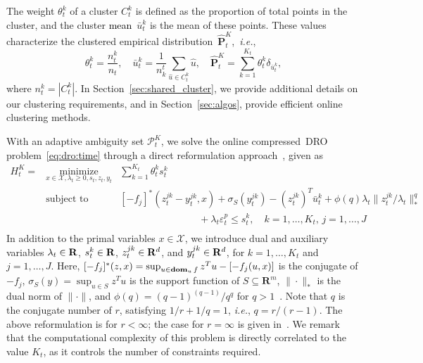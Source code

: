 \documentclass[12pt]{article}
\newcommand{\ie}{{\it i.e.}}
\newcommand{\reals}{{\bf R}}
\newcommand{\prob}{{\mathbf P}}
\newcommand{\dom}{\mathop{\bf dom}_u} %
\newcommand{\define}{=}
\newcommand{\supp}{S}
\newcommand{\unc}{u}
\newcommand{\epsnom}{\varepsilon}
\newcommand{\RC}[1]{\textcolor{black}{#1}}
\newcommand{\RC}[1]{\textcolor{blue}{#1}}
\begin{document}
The weight $\theta^k_t$ of a cluster $C^k_t$ is defined as the proportion of total points in the cluster, and the cluster \RC{mean}~$\bar{\unc}^k_t$ is the mean of these points. These values characterize the clustered empirical distribution~$\hat{\prob}^K_t$,~\ie,
$$\theta_t^k = \frac{n^k_t}{n_t},\quad \bar{u}^k_t = \frac{1}{n^t_k} \sum_{\hat{u} \in C^k_t} \hat{u},\quad \hat{\mathbf{P}}^K_t = \sum_{k=1}^{K_t}\theta_t^k\delta_{\bar{u}_t^k},$$ 
where $n^k_t = |C^k_t|$.
In Section~\ref{sec:shared_cluster}, we provide additional details on our clustering requirements, and in Section~\ref{sec:algos}, provide efficient online clustering methods. 

With an adaptive ambiguity set $\mathcal{P}^K_{t}$, we solve the online compressed~\gls{DRO} problem~\eqref{eq:dro:time} through a direct reformulation approach~\cite[Section 2.4]{mro}, given as
\begin{equation}
	 \label{eq:robustopt_p_max}
	\begin{array}{lll}
 \!\!H^K_t \!= \!\!\!&\underset{x\in\mathcal{X},\lambda_t\geq0,s_t,z_t,y_t}{\mbox{minimize}} & \sum_{k=1}^{K_t} \theta^k_{t} s^k_t\\
&\mbox{subject to}  & [-f_j]^*(z^{jk}_t-y^{jk}_t , x) + \sigma_{{\supp}}(y^{jk}_t) - (z{^{jk}_t})^T\bar{\unc}^k_{t} + \phi(q)\lambda_t \|z^{jk}_t/ \lambda_t \|_*^q   \\
	&	&\hspace{8em}   +\lambda_t \epsnom_{t}^p \leq s^k_t,\quad k = 1,\dots, K_t, \, j =1, \dots, J\\	\end{array}\!\!\!\!\!\!\!\!\!\!\!\!\!
\end{equation}
In addition to the primal variables $x \in \mathcal{X}$, we introduce dual and auxiliary variables $\lambda_t \in \reals$, $s^k_t \in \reals$, $z^{jk}_t \in \reals^{d}$, and $y^{jk}_t \in \reals^d$, for $k=1,\dots,K_t$ and $j=1,\dots,J$.
Here, $[-f_j]^*(z, x) \define \sup_{u\in \dom f} z^Tu - [-f_j(u, x)] $ is the conjugate of $-f_j$, $\sigma_\supp(y) \define\sup_{u \in  \supp}  z^Tu$ is the support function of $ \supp \subseteq \mathbf{R}^m$, $\| \cdot \|_*$ is the dual norm of  $\| \cdot \|$, and $\phi(q) = (q-1)^{(q-1)}/q^q$ for $q > 1$~\cite[Theorem 8]{kuhn2019wasserstein}.
Note that $q$ is the conjugate number of $r$, satisfying $1/r + 1/q = 1$, \ie, $q = r/(r - 1)$. The above reformulation is for $r <\infty$; the case for $r = \infty$ is given in~\cite[Appendix B]{mro}. 
We remark that the computational complexity of this problem is directly correlated to the value $K_t$, as it controls the number of constraints required. 
\end{document}
